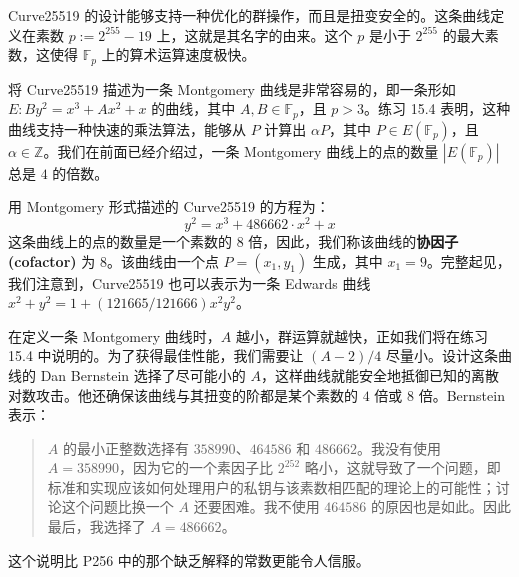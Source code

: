 \begin{snote}[Curve25519。]
Curve25519 的设计能够支持一种优化的群操作，而且是扭变安全的。这条曲线定义在素数 $p:=2^{255}-19$ 上，这就是其名字的由来。这个 $p$ 是小于 $2^{255}$ 的最大素数，这使得 $\mathbb{F}_p$ 上的算术运算速度极快。

将 Curve25519 描述为一条 Montgomery 曲线是非常容易的，即一条形如 $E:By^2=x^3+Ax^2+x$ 的曲线，其中 $A,B\in\mathbb{F}_p$，且 $p>3$。练习 15.4 表明，这种曲线支持一种快速的乘法算法，能够从 $P$ 计算出 $\alpha P$，其中 $P\in E(\mathbb{F}_{p})$，且 $\alpha\in\mathbb{Z}$。我们在前面已经介绍过，一条 Montgomery 曲线上的点的数量 $|E(\mathbb{F}_{p})|$ 总是 $4$ 的倍数。

用 Montgomery 形式描述的 Curve25519 的方程为：
\[
y^2=x^3+486662\cdot x^2+x
\]
这条曲线上的点的数量是一个素数的 $8$ 倍，因此，我们称该曲线的\textbf{协因子 (cofactor)} 为 $8$。该曲线由一个点 $P=(x_1,y_1)$ 生成，其中 $x_1=9$。完整起见，我们注意到，Curve25519 也可以表示为一条 Edwards 曲线 $x^2+y^2=1+(121665/121666)x^2y^2$。
\end{snote}

\begin{snote}[为什么常数是 486662？]
在定义一条 Montgomery 曲线时，$A$ 越小，群运算就越快，正如我们将在练习 15.4 中说明的。为了获得最佳性能，我们需要让 ${(A-2)}/{4}$ 尽量小。设计这条曲线的 Dan Bernstein 选择了尽可能小的 $A$，这样曲线就能安全地抵御已知的离散对数攻击。他还确保该曲线与其扭变的阶都是某个素数的 $4$ 倍或 $8$ 倍。Bernstein 表示：
\begin{quote}
$A$ 的最小正整数选择有 $358990$、$464586$ 和 $486662$。我没有使用 $A=358990$，因为它的一个素因子比 $2^{252}$ 略小，这就导致了一个问题，即标准和实现应该如何处理用户的私钥与该素数相匹配的理论上的可能性；讨论这个问题比换一个 $A$ 还要困难。我不使用 $464586$ 的原因也是如此。因此最后，我选择了 $A=486662$。
\end{quote}
这个说明比 P256 中的那个缺乏解释的常数更能令人信服。
\end{snote}